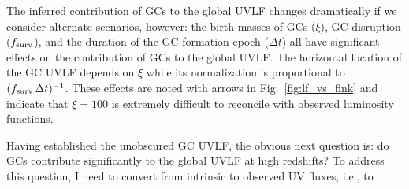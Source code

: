 \documentclass[fleqn,usenatbib]{mnras}
\newcommand{\fsurv}{f_{\rm surv}}
\begin{document}
The inferred contribution of GCs to the global UVLF changes dramatically if we
consider alternate scenarios, however: the birth masses of GCs ($\xi$), GC
disruption ($\fsurv$), and the duration of the GC formation epoch ($\Delta t$)
all have significant effects on the contribution of GCs to the global UVLF. The
horizontal location of the GC UVLF depends on $\xi$ while its normalization is
proportional to $(\fsurv\,\Delta t)^{-1}$. These effects are noted with arrows
in Fig.~\ref{fig:lf_vs_fink} and indicate that $\xi=100$ is extremely difficult
to reconcile with observed luminosity functions.

Having established the unobscured GC UVLF, the obvious next question is: do GCs
contribute significantly to the global UVLF at high redshifts? To address this
question, I need to convert from intrinsic to observed UV fluxes, i.e., to
\end{document}

